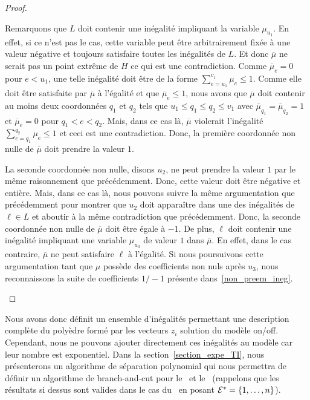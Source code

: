 \begin{proof}
\begin{itemize}
  Remarquons que $L$ doit contenir une inégalité impliquant la
  variable $\mu_{u_1}$. En effet, si ce n'est pas le cas, cette variable
  peut être arbitrairement fixée à une valeur négative et toujours
  satisfaire toutes les inégalités de $L$. Et donc $\overline{\mu}$ ne
  serait pas un point extrême de $H$ ce qui est une contradiction. Comme
  $\overline{\mu}_e=0$ pour $e< u_1$, une telle inégalité doit être de
  la forme $ \sum_{e=u_1}^{v_1} \mu _e \le 1$. Comme elle doit être
  satisfaite par $\overline{\mu}$ à l'égalité et que $\overline{\mu}_e
  \le 1$, nous avons que $\overline{\mu}$ doit contenir au moins deux
  coordonnées $q_1$ et $q_2$ tels que $ u_1 \le q_1 \le q_2 \le v_1$
  avec $\overline{\mu}_{q_1}=\overline{\mu}_{q_2}=1$ et
  $\overline{\mu}_{e}=0$ pour $q_1 < e < q_2$. Mais, dans ce cas là,
  $\overline{\mu}$ violerait l'inégalité $\sum_{e=q_1}^{q_2} \mu_e \le
  1$ et ceci est une contradiction. Donc, la première coordonnée non
  nulle de $\overline{\mu}$ doit 
  prendre la valeur $1$. 
  
  La seconde coordonnée non nulle, disons
  $u_2$, ne peut prendre la valeur $1$ par le même raisonnement que
  précédemment. Donc, cette valeur doit être négative et
  entière. Mais, dans ce cas là, nous pouvons suivre la même
  argumentation que précédemment pour montrer que $u_2$ doit
  apparaître dans une des inégalités de $\ell \in L$ et aboutir à la même
  contradiction que précédemment. Donc, la seconde coordonnée non nulle
  de $\overline{\mu}$ doit être égale à $-1$. De plus, $\ell$ doit
  contenir une inégalité impliquant une variable $\mu_{u_3}$ de valeur
  $1$ dans $\overline{\mu}$. En effet, dans le cas contraire,
  $\overline{\mu}$ ne peut satisfaire $\ell$ à l'égalité. Si nous
  poursuivons cette argumentation tant que $\mu$ possède des
  coefficients non nuls après $u_3$, nous reconnaissons la suite de
coefficients $1/-1$ présente dans~\eqref{non_preem_ineg}.
\end{itemize}
\end{proof}

Nous avons donc définit un ensemble d'inégalités permettant une
description complète du polyèdre formé par les vecteurs $z_i$ solution
du modèle on/off. Cependant, nous ne pouvons ajouter directement ces
inégalités au modèle car leur nombre est exponentiel. Dans la
section~\ref{section_expe_TI}, nous présenterons un algorithme de
séparation polynomial qui nous permettra de définir un algorithme de
branch-and-cut pour le \CECSP~et le \RCPSP~(rappelons que les
résultats si dessus sont valides dans le cas du \RCPSP~en posant
${\cal E}^*=\{1,\dots,n\}$). 

